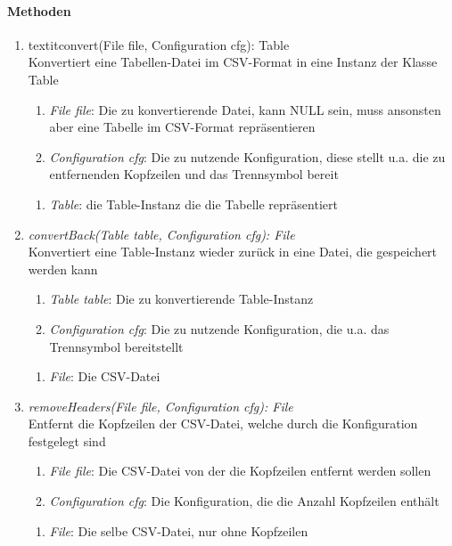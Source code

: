 \paragraph{Methoden}

\begin{enumerate}[+]
	\item textit{convert(File file, Configuration cfg): Table} \\
	Konvertiert eine Tabellen-Datei im CSV-Format in eine Instanz der Klasse Table
	
	\begin{enumerate}[$\bullet$]
		\item \textit{File file}: Die zu konvertierende Datei, kann NULL sein, muss ansonsten aber eine Tabelle im CSV-Format repräsentieren
		\item \textit{Configuration cfg}: Die zu nutzende Konfiguration, diese stellt u.a. die zu entfernenden Kopfzeilen und das Trennsymbol bereit
	\end{enumerate}
	\vspace{-0.2cm}
	\begin{enumerate}[$\circ$]
		\item \textit{Table}: die Table-Instanz die die Tabelle repräsentiert
	\end{enumerate}
	
	\item \textit{convertBack(Table table, Configuration cfg): File} \\
	Konvertiert eine Table-Instanz wieder zurück in eine Datei, die gespeichert werden kann
	\begin{enumerate}[$\bullet$]
		\item \textit{Table table}: Die zu konvertierende Table-Instanz
		\item \textit{Configuration cfg}: Die zu nutzende Konfiguration, die u.a. das Trennsymbol bereitstellt
	\end{enumerate}
	\vspace{-0.2cm}
	\begin{enumerate}[$\circ$]
		\item \textit{File}: Die CSV-Datei
	\end{enumerate}

	\item \textit{removeHeaders(File file, Configuration cfg): File} \\
	Entfernt die Kopfzeilen der CSV-Datei, welche durch die Konfiguration festgelegt sind
	\begin{enumerate}[$\bullet$]
		\item \textit{File file}: Die CSV-Datei von der die Kopfzeilen entfernt werden sollen
		\item \textit{Configuration cfg}: Die Konfiguration, die die Anzahl Kopfzeilen enthält
	\end{enumerate}
	\vspace{-0.2cm}
	\begin{enumerate}[$\circ$]
		\item \textit{File}: Die selbe CSV-Datei, nur ohne Kopfzeilen
	\end{enumerate}
\end{enumerate}

